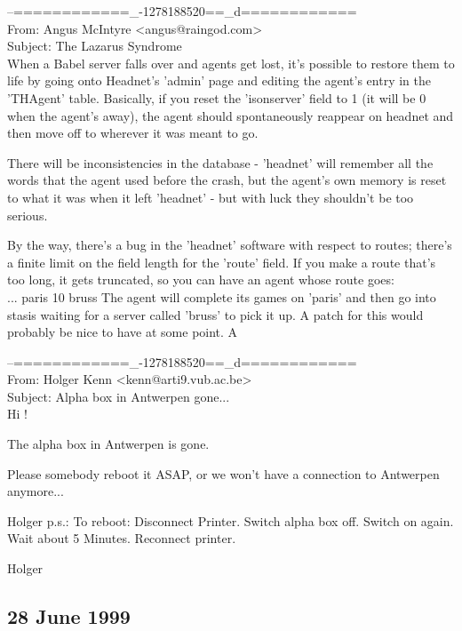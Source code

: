 \begin{mail}
--============\_-1278188520==\_d============\\
From: Angus McIntyre <angus@raingod.com>\\
Subject: The Lazarus Syndrome\\

When a Babel server falls over and agents get lost, it's possible to 
restore them to life by going onto Headnet's 'admin' page and editing 
the agent's entry in the 'THAgent' table. Basically, if you reset 
the 'isonserver' field to 1 (it will be 0 when the agent's away), 
the agent should spontaneously reappear on headnet and then move 
off to wherever it was meant to go.

There will be inconsistencies in the database - 'headnet' will 
remember all the words that the agent used before the crash, but 
the agent's own memory is reset to what it was when it left 'headnet' - 
but with luck they shouldn't be too serious.

By the way, there's a bug in the 'headnet' software with respect to 
routes; there's a finite limit on the field length for the 'route' 
field. If you make a route that's too long, it gets truncated, so 
you can have an agent whose route goes:\\
	... paris 10 bruss
The agent will complete its games on 'paris' and then go into 
stasis waiting for a server called 'bruss' to pick it up. A patch 
for this would probably be nice to have at some point.
\enlargethispage{1em}
	A
\end{mail}

\begin{mail}
--============\_-1278188520==\_d============\\
From: Holger Kenn <kenn@arti9.vub.ac.be>\\
Subject: Alpha box in Antwerpen gone...\\

Hi !

The alpha box in Antwerpen is gone.

Please somebody reboot it ASAP, or we won't have a connection to
Antwerpen anymore...

Holger
p.s.: 
To reboot: 
	Disconnect Printer.
	Switch alpha box off.
	Switch on again.
	Wait about 5 Minutes.
	Reconnect printer.

Holger
\end{mail}

\subsection*{28 June 1999} 

